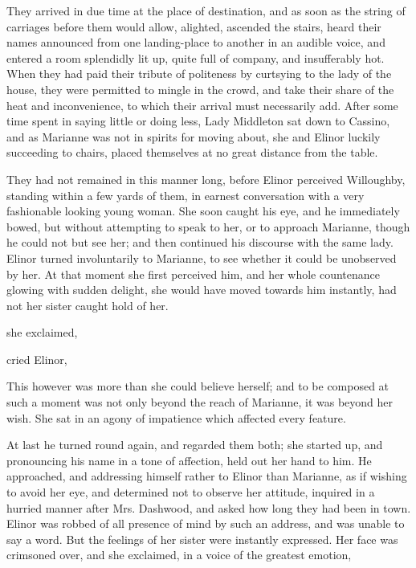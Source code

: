 They arrived in due time at the place of destination, and as soon as the string of carriages before them would allow, alighted, ascended the stairs, heard their names announced from one landing-place to another in an audible voice, and entered a room splendidly lit up, quite full of company, and insufferably hot. When they had paid their tribute of politeness by curtsying to the lady of the house, they were permitted to mingle in the crowd, and take their share of the heat and inconvenience, to which their arrival must necessarily add. After some time spent in saying little or doing less, Lady Middleton sat down to Cassino, and as Marianne was not in spirits for moving about, she and Elinor luckily succeeding to chairs, placed themselves at no great distance from the table.

They had not remained in this manner long, before Elinor perceived Willoughby, standing within a few yards of them, in earnest conversation with a very fashionable looking young woman. She soon caught his eye, and he immediately bowed, but without attempting to speak to her, or to approach Marianne, though he could not but see her; and then continued his discourse with the same lady. Elinor turned involuntarily to Marianne, to see whether it could be unobserved by her. At that moment she first perceived him, and her whole countenance glowing with sudden delight, she would have moved towards him instantly, had not her sister caught hold of her.

 she exclaimed, 

 cried Elinor, 

This however was more than she could believe herself; and to be composed at such a moment was not only beyond the reach of Marianne, it was beyond her wish. She sat in an agony of impatience which affected every feature.

At last he turned round again, and regarded them both; she started up, and pronouncing his name in a tone of affection, held out her hand to him. He approached, and addressing himself rather to Elinor than Marianne, as if wishing to avoid her eye, and determined not to observe her attitude, inquired in a hurried manner after Mrs. Dashwood, and asked how long they had been in town. Elinor was robbed of all presence of mind by such an address, and was unable to say a word. But the feelings of her sister were instantly expressed. Her face was crimsoned over, and she exclaimed, in a voice of the greatest emotion, 


